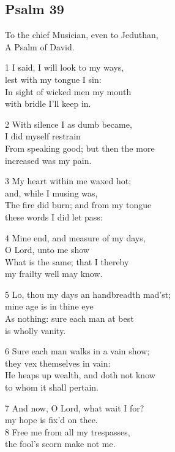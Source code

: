 \begin{center}
\quad{}\quad{}
\end{center}

\subsection*{Psalm 39}

To the chief Musician, even to Jeduthan,\\
A Psalm of David.

1 I said, I will look to my ways,\\
lest with my tongue I sin:\\
In sight of wicked men my mouth\\
with bridle I’ll keep in.

2 With silence I as dumb became,\\
I did myself restrain\\
From speaking good; but then the more\\
increased was my pain.

3 My heart within me waxed hot;\\
and, while I musing was,\\
The fire did burn; and from my tongue\\
these words I did let pass:

4 Mine end, and measure of my days,\\
O Lord, unto me show\\
What is the same; that I thereby\\
my frailty well may know.

5 Lo, thou my days an handbreadth mad’st;\\
mine age is in thine eye\\
As nothing: sure each man at best\\
is wholly vanity.

6 Sure each man walks in a vain show;\\
they vex themselves in vain:\\
He heaps up wealth, and doth not know\\
to whom it shall pertain.

7 And now, O Lord, what wait I for?\\
my hope is fix’d on thee.\\
8 Free me from all my trespasses,\\
the fool’s scorn make not me.

